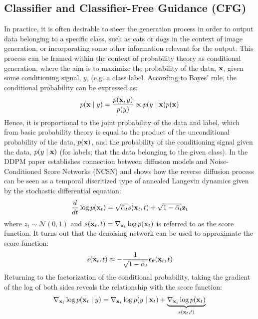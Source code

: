 \subsection{Classifier and Classifier-Free Guidance (CFG)}
In practice, it is often desirable to steer the generation process in order to output data belonging to a specific class, such as cats or dogs in the context of image generation, or incorporating some other information relevant for the output. This process can be framed within the context of probability theory as conditional generation, where the aim is to maximize the probability of the data, $\boldsymbol{\mathbf{x}}$, given some conditioning signal, $y$, (e.g. a class label. According to Bayes' rule, the conditional probability can be expressed as:
\begin{equation}
    p(\boldsymbol{\mathbf{x}} \mid y) = \frac{p(\boldsymbol{\mathbf{x}}, y)}{p(y)} \propto p(y \mid \boldsymbol{\mathbf{x}}) p(\boldsymbol{\mathbf{x}})
\end{equation}
Hence, it is proportional to the joint probability of the data and label, which from basic probability theory is equal to the product of the unconditional probability of the data, $p(\boldsymbol{\mathbf{x}})$, and the probability of the conditioning signal given the data, $p(y \mid \boldsymbol{\mathbf{x}})$ (for labels; that the data belonging to the given class). In the DDPM paper \cite{ho2020denoising} establishes connection between diffusion models and Noise-Conditioned Score Networks (NCSN) and shows how the reverse diffusion process can be seen as a temporal discritized type of annealed Langevin dynamics given by the stochastic differential equation:
\begin{equation}
    \frac{d}{dt} \log p(\boldsymbol{\mathbf{x}}_t) = \sqrt{\bar{\alpha}_t} s(\boldsymbol{\mathbf{x}}_t, t) + \sqrt{1 - \bar{\alpha}_t} \boldsymbol{\mathbf{z}}_t
\end{equation}
where $z_t \sim \mathcal{N}(0, 1)$ and $s(\boldsymbol{\mathbf{x}}_t, t) = \nabla_{\boldsymbol{\mathbf{x}}_t} \log p(\boldsymbol{\mathbf{x}}_t)$ is referred to as the score function. It turns out that the denoising network can be used to approximate the score function:
\begin{equation}
    s(\boldsymbol{\mathbf{x}}_t, t) \approx -\frac{1}{\sqrt{1 - \bar{\alpha}_t}} \boldsymbol{\mathbf{\epsilon}}_\theta(\boldsymbol{\mathbf{x}}_t, t)
\end{equation}
Returning to the factorization of the conditional probability, taking the gradient of the log of both sides reveals the relationship with the score function:
\begin{equation}
    \nabla_{\boldsymbol{\mathbf{x}}_t} \log p(\boldsymbol{\mathbf{x}}_t \mid y ) = \nabla_{\boldsymbol{\mathbf{x}}_t} \log p(y \mid \boldsymbol{\mathbf{x}}_t) + \underbrace{\nabla_{\boldsymbol{\mathbf{x}}_t} \log p(\boldsymbol{\mathbf{x}}_t)}_{s(\boldsymbol{\mathbf{x}}_t, t)}
\end{equation}
